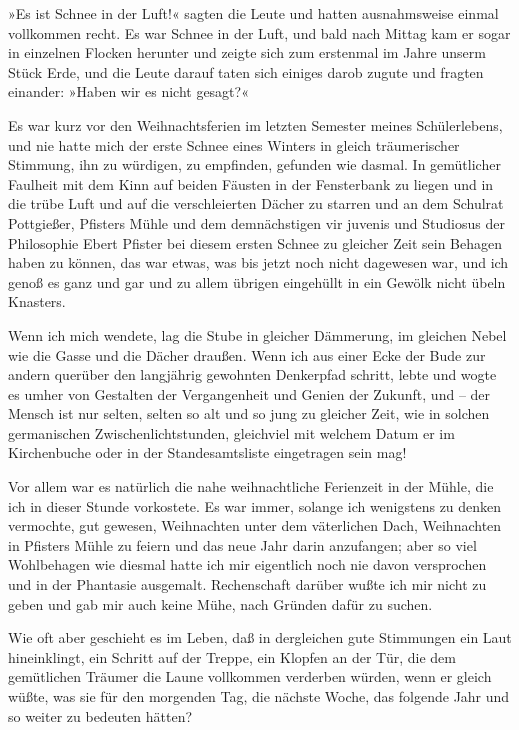 »Es ist Schnee in der Luft!« sagten die Leute und hatten
ausnahmsweise einmal vollkommen recht. Es war Schnee in der Luft,
und bald nach Mittag kam er sogar in einzelnen Flocken herunter und
zeigte sich zum erstenmal im Jahre unserm Stück Erde, und die Leute
darauf taten sich einiges darob zugute und fragten einander: »Haben
wir es nicht gesagt?«

Es war kurz vor den Weihnachtsferien im letzten Semester meines
Schülerlebens, und nie hatte mich der erste Schnee eines Winters in
gleich träumerischer Stimmung, ihn zu würdigen, zu empfinden,
gefunden wie dasmal. In gemütlicher Faulheit mit dem Kinn auf
beiden Fäusten in der Fensterbank zu liegen und in die trübe Luft
und auf die verschleierten Dächer zu starren und an dem Schulrat
Pottgießer, Pfisters Mühle und dem demnächstigen vir juvenis und
Studiosus der Philosophie Ebert Pfister bei diesem ersten Schnee zu
gleicher Zeit sein Behagen haben zu können, das war etwas, was bis
jetzt noch nicht dagewesen war, und ich genoß es ganz und gar und
zu allem übrigen eingehüllt in ein Gewölk nicht übeln Knasters.

Wenn ich mich wendete, lag die Stube in gleicher Dämmerung, im
gleichen Nebel wie die Gasse und die Dächer draußen. Wenn ich aus
einer Ecke der Bude zur andern querüber den langjährig gewohnten
Denkerpfad schritt, lebte und wogte es umher von Gestalten der
Vergangenheit und Genien der Zukunft, und – der Mensch ist nur
selten, selten so alt und so jung zu gleicher Zeit, wie in solchen
germanischen Zwischenlichtstunden, gleichviel mit welchem Datum er
im Kirchenbuche oder in der Standesamtsliste eingetragen sein mag!

Vor allem war es natürlich die nahe weihnachtliche Ferienzeit in
der Mühle, die ich in dieser Stunde vorkostete. Es war immer,
solange ich wenigstens zu denken vermochte, gut gewesen,
Weihnachten unter dem väterlichen Dach, Weihnachten in Pfisters
Mühle zu feiern und das neue Jahr darin anzufangen; aber so viel
Wohlbehagen wie diesmal hatte ich mir eigentlich noch nie davon
versprochen und in der Phantasie ausgemalt. Rechenschaft darüber
wußte ich mir nicht zu geben und gab mir auch keine Mühe, nach
Gründen dafür zu suchen.

Wie oft aber geschieht es im Leben, daß in dergleichen gute
Stimmungen ein Laut hineinklingt, ein Schritt auf der Treppe, ein
Klopfen an der Tür, die dem gemütlichen Träumer die Laune
vollkommen verderben würden, wenn er gleich wüßte, was sie für den
morgenden Tag, die nächste Woche, das folgende Jahr und so weiter
zu bedeuten hätten?

